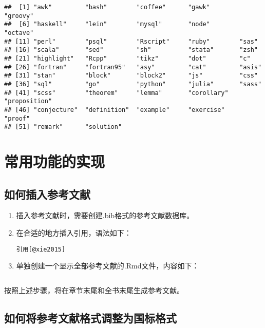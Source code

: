 \documentclass[]{ctexbook}
\begin{document}
\begin{verbatim}
##  [1] "awk"         "bash"        "coffee"      "gawk"        "groovy"     
##  [6] "haskell"     "lein"        "mysql"       "node"        "octave"     
## [11] "perl"        "psql"        "Rscript"     "ruby"        "sas"        
## [16] "scala"       "sed"         "sh"          "stata"       "zsh"        
## [21] "highlight"   "Rcpp"        "tikz"        "dot"         "c"          
## [26] "fortran"     "fortran95"   "asy"         "cat"         "asis"       
## [31] "stan"        "block"       "block2"      "js"          "css"        
## [36] "sql"         "go"          "python"      "julia"       "sass"       
## [41] "scss"        "theorem"     "lemma"       "corollary"   "proposition"
## [46] "conjecture"  "definition"  "example"     "exercise"    "proof"      
## [51] "remark"      "solution"
\end{verbatim}

\hypertarget{howtodo}{%
\chapter{常用功能的实现}\label{howtodo}}

\hypertarget{ux5982ux4f55ux63d2ux5165ux53c2ux8003ux6587ux732e}{%
\section{如何插入参考文献}\label{ux5982ux4f55ux63d2ux5165ux53c2ux8003ux6587ux732e}}

\begin{enumerate}
\def\labelenumi{\arabic{enumi}.}
\item
  插入参考文献时，需要创建.bib格式的参考文献数据库。
\item
  在合适的地方插入引用\citep{xie2015}，语法如下：

\begin{verbatim}
引用[@xie2015]
\end{verbatim}
\item
  单独创建一个显示全部参考文献的.Rmd文件，内容如下：

\begin{verbatim}
\end{verbatim}
\end{enumerate}

按照上述步骤，将在章节末尾和全书末尾生成参考文献。

\hypertarget{ux5982ux4f55ux5c06ux53c2ux8003ux6587ux732eux683cux5f0fux8c03ux6574ux4e3aux56fdux6807ux683cux5f0f}{%
\section{如何将参考文献格式调整为国标格式}\label{ux5982ux4f55ux5c06ux53c2ux8003ux6587ux732eux683cux5f0fux8c03ux6574ux4e3aux56fdux6807ux683cux5f0f}}
\end{document}
